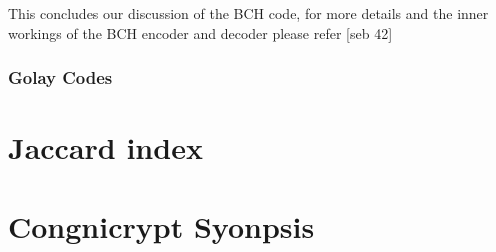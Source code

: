 This concludes our discussion of the BCH code, for more details and the inner workings of the BCH encoder and decoder please refer [seb 42]


\subsubsection{Golay Codes}


\section{Jaccard index}

\section{Congnicrypt Syonpsis}

